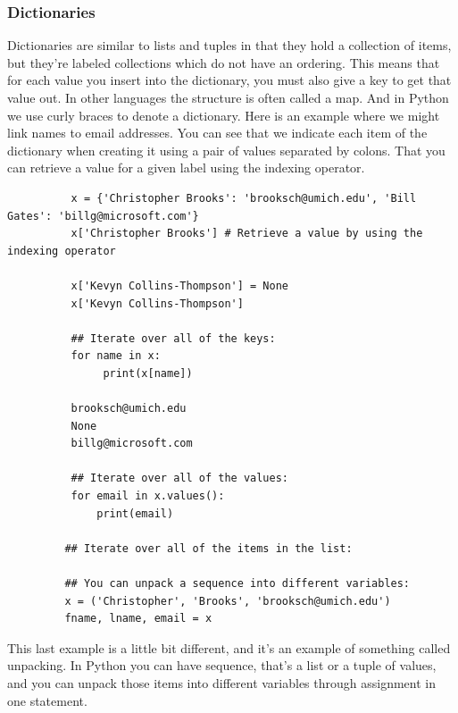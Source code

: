\documentclass[11pt]{article}
\begin{document}
        \subsubsection{Dictionaries}
        Dictionaries are similar to lists and tuples in that they hold
        a collection of items, but they're labeled collections which do not
        have an ordering. This means that for each value you insert into the
        dictionary, you must also give a key to get that value out. In other
        languages the structure is often called a map. And in Python we use
        curly braces to denote a dictionary. Here is an example where we might
        link names to email addresses. You can see that we indicate each item
        of the dictionary when creating it using a pair of values separated by
        colons. That you can retrieve a value for a given label using the
        indexing operator.
        \begin{lstlisting}
          x = {'Christopher Brooks': 'brooksch@umich.edu', 'Bill Gates': 'billg@microsoft.com'}
          x['Christopher Brooks'] # Retrieve a value by using the indexing operator

          x['Kevyn Collins-Thompson'] = None
          x['Kevyn Collins-Thompson']

          ## Iterate over all of the keys:
          for name in x:
               print(x[name])

          brooksch@umich.edu
          None
          billg@microsoft.com

          ## Iterate over all of the values:
          for email in x.values():
              print(email)
          
         ## Iterate over all of the items in the list:

         ## You can unpack a sequence into different variables:
         x = ('Christopher', 'Brooks', 'brooksch@umich.edu')
         fname, lname, email = x
        \end{lstlisting}
        This last example is a little bit different, and it's an
        example of something called unpacking. In Python you can have
        sequence, that's a list or a tuple of values, and you can unpack those
        items into different variables through assignment in one statement.
\end{document}
